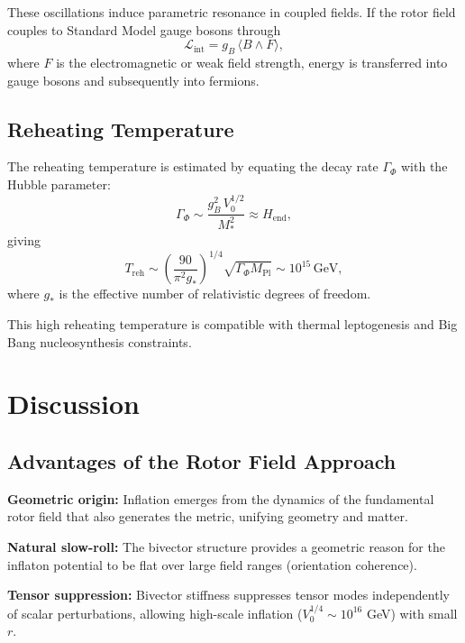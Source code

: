 \documentclass[11pt,a4paper]{article}
\numberwithin{equation}{section}
\theoremstyle{plain}
\theoremstyle{definition}
\theoremstyle{remark}
\begin{document}
These oscillations induce parametric resonance in coupled fields. If the rotor field couples to Standard Model gauge bosons through
\begin{equation}
\mathcal{L}_{\mathrm{int}} = g_B\,\langle B \wedge F \rangle,
\label{eq:coupling}
\end{equation}
where $F$ is the electromagnetic or weak field strength, energy is transferred into gauge bosons and subsequently into fermions.

\subsection{Reheating Temperature}

The reheating temperature is estimated by equating the decay rate $\Gamma_{\Phi}$ with the Hubble parameter:
\begin{equation}
\Gamma_{\Phi} \sim \frac{g_B^2\,V_0^{1/2}}{M_*^2} \approx H_{\mathrm{end}},
\end{equation}
giving
\begin{equation}
T_{\mathrm{reh}} \sim \left(\frac{90}{\pi^2 g_*}\right)^{1/4}\sqrt{\Gamma_{\Phi} M_{\mathrm{Pl}}} \sim 10^{15}\,\mathrm{GeV},
\label{eq:reheat-temp}
\end{equation}
where $g_*$ is the effective number of relativistic degrees of freedom.

This high reheating temperature is compatible with thermal leptogenesis and Big Bang nucleosynthesis constraints.

\section{Discussion}
\label{sec:discussion}

\subsection{Advantages of the Rotor Field Approach}

\textbf{Geometric origin:} Inflation emerges from the dynamics of the fundamental rotor field that also generates the metric, unifying geometry and matter.

\textbf{Natural slow-roll:} The bivector structure provides a geometric reason for the inflaton potential to be flat over large field ranges (orientation coherence).

\textbf{Tensor suppression:} Bivector stiffness suppresses tensor modes independently of scalar perturbations, allowing high-scale inflation ($V_0^{1/4} \sim 10^{16}$ GeV) with small $r$.
\end{document}
